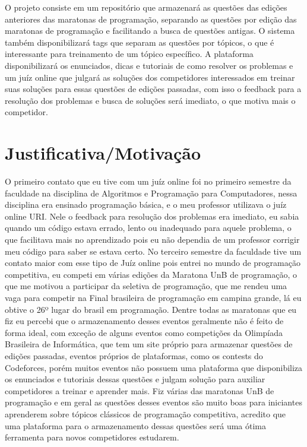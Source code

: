 O projeto consiste em um repositório que armazenará as questões das edições anteriores das
maratonas de programação, separando as questões por edição das maratonas de programação e
facilitando a busca de questões antigas. O sistema também disponibilizará tags que separam as
questões por tópicos, o que é interessante para treinamento de um tópico específico. A plataforma
disponibilizará os enunciados, dicas e tutoriais de como resolver os problemas e um juíz online que
julgará as soluções dos competidores interessados em treinar suas soluções para essas questões de
edições passadas, com isso o feedback para a resolução dos problemas e busca de soluções será
imediato, o que motiva mais o competidor.


\section{Justificativa/Motivação}

O primeiro contato que eu tive com um juíz online foi no primeiro semestre da faculdade na
disciplina de Algoritmos e Programação para Computadores, nessa disciplina era ensinado programação
básica, e o meu professor utilizava o juíz online URI. Nele o feedback para resolução dos problemas
era imediato, eu sabia quando um código estava errado, lento ou inadequado para aquele problema, o
que facilitava mais no aprendizado pois eu não dependia de um professor corrigir meu código para
saber se estava certo. No terceiro semestre da faculdade tive um contato maior com esse tipo de
Juíz online pois entrei no mundo de programação competitiva, eu competi em várias edições da
Maratona UnB de programação, o que me motivou a participar da seletiva de programação, que me
rendeu uma vaga para competir na Final brasileira de programação em campina grande, lá eu obtive o
26º lugar do brasil em programação. Dentre todas as maratonas que eu fiz eu percebi que o
armazenamento desses eventos geralmente não é feito de forma ideal, com exceção de alguns eventos
como competições da Olimpíada Brasileira de Informática, que tem um site próprio para armazenar
questões de edições passadas, eventos próprios de plataformas, como os contests do Codeforces,
porém muitos eventos não possuem uma plataforma que disponibiliza os enunciados e tutoriais dessas
questões e julgam solução para auxiliar competidores a treinar e aprender mais. Fiz várias das
maratonas UnB de programação e em geral as questões desses eventos são muito boas para iniciantes
aprenderem sobre tópicos clássicos de programação competitiva, acredito que uma plataforma para o
armazenamento dessas questões será uma ótima ferramenta para novos competidores estudarem.

